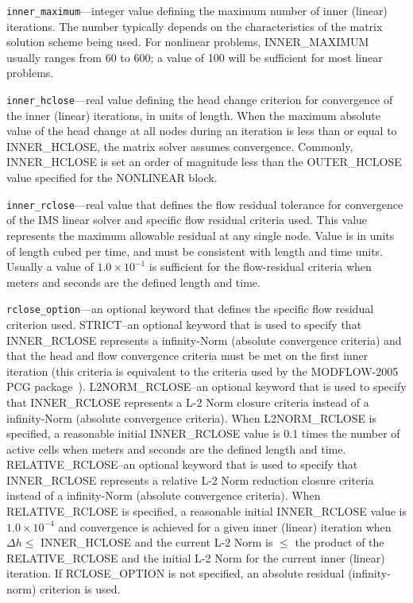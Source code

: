 \begin{description}
\item \texttt{inner\_maximum}---integer value defining the maximum number of inner (linear) iterations. The number typically depends on the characteristics of the matrix solution scheme being used. For nonlinear problems, INNER\_MAXIMUM usually ranges from 60 to 600; a value of 100 will be sufficient for most linear problems.

\item \texttt{inner\_hclose}---real value defining the head change criterion for convergence of the inner (linear) iterations, in units of length. When the maximum absolute value of the head change at all nodes during an iteration is less than or equal to INNER\_HCLOSE, the matrix solver assumes convergence. Commonly, INNER\_HCLOSE is set an order of magnitude less than the OUTER\_HCLOSE value specified for the NONLINEAR block.

\item \texttt{inner\_rclose}---real value that defines the flow residual tolerance for convergence of the IMS linear solver and specific flow residual criteria used. This value represents the maximum allowable residual at any single node.  Value is in units of length cubed per time, and must be consistent with \mf length and time units. Usually a value of $1.0 \times 10^{-1}$ is sufficient for the flow-residual criteria when meters and seconds are the defined \mf length and time.

\item \texttt{rclose\_option}---an optional keyword that defines the specific flow residual criterion used.  STRICT--an optional keyword that is used to specify that INNER\_RCLOSE represents a infinity-Norm (absolute convergence criteria) and that the head and flow convergence criteria must be met on the first inner iteration (this criteria is equivalent to the criteria used by the MODFLOW-2005 PCG package~\citep{hill1990preconditioned}). L2NORM\_RCLOSE--an optional keyword that is used to specify that INNER\_RCLOSE represents a L-2 Norm closure criteria instead of a infinity-Norm (absolute convergence criteria). When L2NORM\_RCLOSE is specified, a reasonable initial INNER\_RCLOSE value is 0.1 times the number of active cells when meters and seconds are the defined \mf length and time.  RELATIVE\_RCLOSE--an optional keyword that is used to specify that INNER\_RCLOSE represents a relative L-2 Norm reduction closure criteria instead of a infinity-Norm (absolute convergence criteria). When RELATIVE\_RCLOSE is specified, a reasonable initial INNER\_RCLOSE value is $1.0 \times 10^{-4}$ and convergence is achieved for a given inner (linear) iteration when $\Delta h \le$ INNER\_HCLOSE and the current L-2 Norm is $\le$ the product of the RELATIVE\_RCLOSE and the initial L-2 Norm for the current inner (linear) iteration. If RCLOSE\_OPTION is not specified, an absolute residual (infinity-norm) criterion is used.


\end{description}
